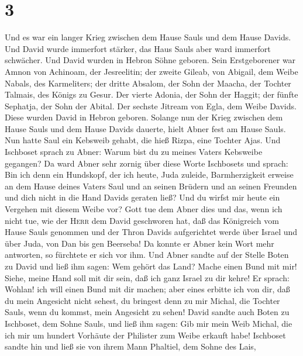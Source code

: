 \hypertarget{section-2}{%
\section{3}\label{section-2}}

 Und es war ein langer Krieg zwischen dem Hause Sauls und
dem Hause Davids. Und David wurde immerfort stärker, das Haus Sauls aber
ward immerfort schwächer.  Und David wurden in Hebron
Söhne geboren. Sein Erstgeborener war Amnon von Achinoam, der
Jesreelitin;  der zweite Gileab, von Abigail, dem Weibe
Nabals, des Karmeliters; der dritte Absalom, der Sohn der Maacha, der
Tochter Talmais, des Königs zu Gesur.  Der vierte Adonia,
der Sohn der Haggit; der fünfte Sephatja, der Sohn der Abital.
 Der sechste Jitream von Egla, dem Weibe Davids. Diese
wurden David in Hebron geboren.  Solange nun der Krieg
zwischen dem Hause Sauls und dem Hause Davids dauerte, hielt Abner fest
am Hause Sauls.  Nun hatte Saul ein Kebsweib gehabt, die
hieß Rizpa, eine Tochter Ajas. Und Ischboset sprach zu Abner: Warum bist
du zu meines Vaters Kebsweibe gegangen?  Da ward Abner
sehr zornig über diese Worte Ischbosets und sprach: Bin ich denn ein
Hundskopf, der ich heute, Juda zuleide, Barmherzigkeit erweise an dem
Hause deines Vaters Saul und an seinen Brüdern und an seinen Freunden
und dich nicht in die Hand Davids geraten ließ? Und du wirfst mir heute
ein Vergehen mit diesem Weibe vor?  Gott tue dem Abner
dies und das, wenn ich nicht tue, wie der \textsc{Herr} dem David
geschworen hat,  daß das Königreich vom Hause Sauls
genommen und der Thron Davids aufgerichtet werde über Israel und über
Juda, von Dan bis gen Beerseba!  Da konnte er Abner kein
Wort mehr antworten, so fürchtete er sich vor ihm.  Und
Abner sandte auf der Stelle Boten zu David und ließ ihm sagen: Wem
gehört das Land? Mache einen Bund mit mir! Siehe, meine Hand soll mit
dir sein, daß ich ganz Israel zu dir kehre!  Er sprach:
Wohlan! ich will einen Bund mit dir machen; aber eines erbitte ich von
dir, daß du mein Angesicht nicht sehest, du bringest denn zu mir Michal,
die Tochter Sauls, wenn du kommst, mein Angesicht zu sehen!
 David sandte auch Boten zu Ischboset, dem Sohne Sauls,
und ließ ihm sagen: Gib mir mein Weib Michal, die ich mir um hundert
Vorhäute der Philister zum Weibe erkauft habe!  Ischboset
sandte hin und ließ sie von ihrem Mann Phaltiel, dem Sohne des Lais,
